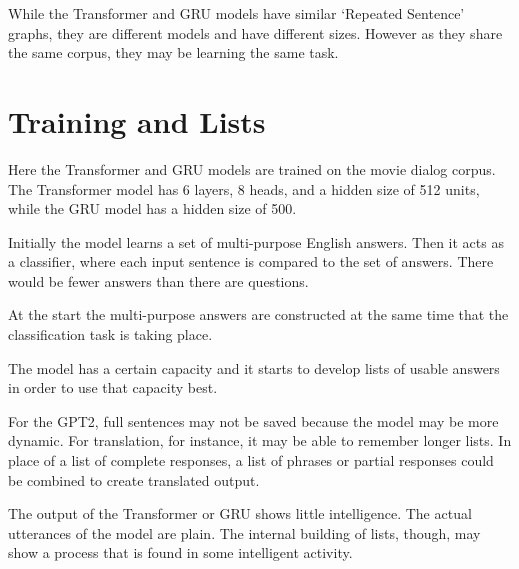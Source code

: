 While the Transformer and GRU models have similar `Repeated Sentence' graphs, they are different models and have different sizes. 
However as they share the same corpus, they may be learning the same task.

\section{Training and Lists}

Here the Transformer and GRU models are trained on the movie dialog corpus. The Transformer model has 6 layers, 8 heads, and a hidden size of 512 units, while the GRU model has a hidden size of 500.

Initially the model learns a set of multi-purpose English answers. Then it acts as a classifier, where each input sentence is compared to the set of answers. There would be fewer answers than there are questions. 

At the start the multi-purpose answers are constructed at the same time that the classification task is taking place. 


The model has a certain capacity and it starts to develop lists of usable answers in order to use that capacity best.

For the GPT2, full sentences may not be saved because the model may be more dynamic. For translation, for instance, it may be able to remember longer lists. In place of a list of complete responses, a list of phrases or partial responses could be combined to create translated output.

The output of the Transformer or GRU shows little intelligence. The actual utterances of the model are plain. The internal building of lists, though, may show a process that is found in some intelligent activity.